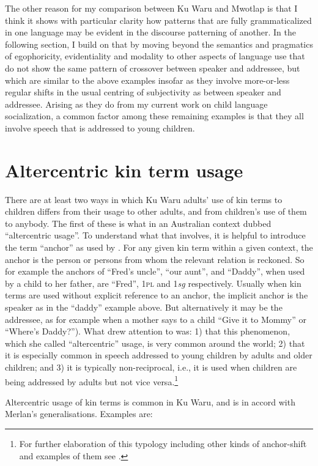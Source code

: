 \documentclass[output=paper]{langsci/langscibook}
\begin{document}
The other reason for my comparison between Ku Waru and Mwotlap is that I think it shows with particular clarity how patterns that are fully grammaticalized in one language may be evident in the discourse patterning of another. In the following section, I build on that by moving beyond the semantics and pragmatics of egophoricity, evidentiality and modality to other aspects of language use that do not show the same pattern of crossover between speaker and addressee, but which are similar to the above examples insofar as they involve more-or-less regular shifts in the usual centring of subjectivity as between speaker and addressee.  Arising as they do from my current work on child language socialization, a common factor among these remaining examples is that they all involve speech that is addressed to young children.

\section{Altercentric kin term usage}\label{s:ar3}

There are at least two ways in which Ku Waru adults’ use of kin terms to children differs from their usage to other adults, and from children’s use of them to anybody. The first of these is what \cite{Merlan1982} in an Australian context dubbed “altercentric usage”. To understand what that involves, it is helpful to introduce the term “anchor” as used by \cite{DahlK-T2001}. For any given kin term within a given context, the anchor is the person or persons from whom the relevant relation is reckoned. So for example the anchors of “Fred’s uncle”, “our aunt”,  and “Daddy”, when used by a child to her father, are “Fred”, 1\textsc{pl} and 1\textit{sg}  respectively. Usually when kin terms are used without explicit reference to an anchor, the implicit anchor is the speaker as in the “daddy” example above. But alternatively it may be the addressee, as for example when a mother says to a child “Give it to Mommy” or “Where’s Daddy?”). What \cite{Merlan1982} drew attention to was: 1) that this phenomenon, which she called “altercentric” usage, is very common around the world; 2) that it is especially common in speech addressed to young children by adults and older children; and 3) it is typically non-reciprocal, i.e., it is used when children are being addressed by adults but not vice versa.\footnote{For further elaboration of this typology including other kinds of anchor-shift and examples of them see \cite{Agha2006}.} 

Altercentric usage of kin terms is common in Ku Waru, and is in accord with Merlan’s generalisations. Examples are:
\end{document}
